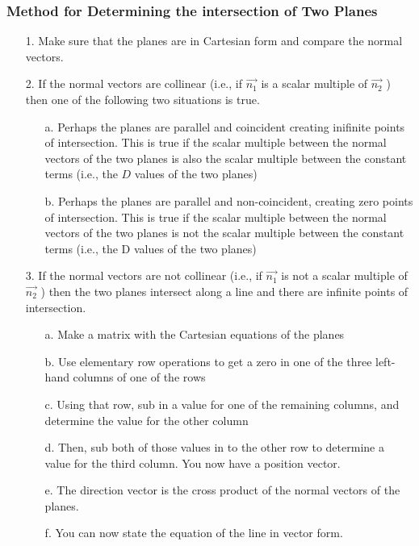 \documentclass{article}
\begin{document}
\subsubsection{Method for Determining the intersection of Two Planes}
\begin{enumerate}
    \item [1.] Make sure that the planes are in Cartesian form and compare the normal vectors.
    \item [2.] If the normal vectors are collinear (i.e., if $\overrightarrow{n_1}$ is a scalar multiple of $\overrightarrow{n_2}$ ) then one of the following two situations is true.
    \begin{enumerate}
    \item [a.] Perhaps the planes are parallel and coincident creating inifinite points of intersection. This is true if the scalar multiple between the normal vectors of the two planes is also the scalar multiple between the constant terms (i.e., the $D$ values of the two planes)
    \item[b.] Perhaps the planes are parallel and non-coincident, creating zero points of intersection. This is true if the scalar multiple between the normal vectors of the two planes is not the scalar multiple between the constant terms (i.e., the D values of the two planes)
    \end{enumerate}

\item[3.] If the normal vectors are not collinear (i.e., if $\overrightarrow{n_1}$ is not a scalar multiple of $\overrightarrow{n_2}$ ) then the two planes intersect along a line and there are infinite points of intersection.
\begin{enumerate}
    \item[a.] Make a matrix with the Cartesian equations of the planes
    \item[b.] Use elementary row operations to get a zero in one of the three left-hand columns of one of the rows
    \item[c.] Using that row, sub in a value for one of the remaining columns, and determine the value for the other column
    \item[d.] Then, sub both of those values in to the other row to determine a value for the third column. You now have a position vector.
    \item[e.] The direction vector is the cross product of the normal vectors of the planes.
    \item[f.] You can now state the equation of the line in vector form.
\end{enumerate}
\end{enumerate}
\end{document}
